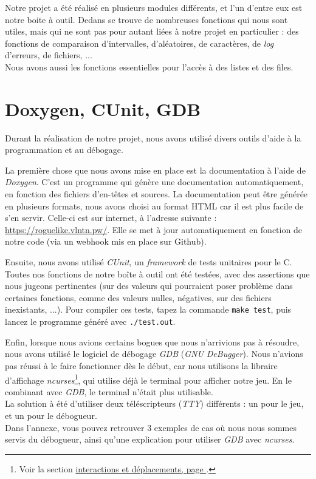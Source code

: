 \documentclass[11pt]{report}
\begin{document}
		Notre projet a été réalisé en plusieurs modules différents, et l'un d'entre eux est notre boite à outil. Dedans se trouve de nombreuses fonctions qui nous sont utiles, mais qui ne sont pas pour autant liées à notre projet en particulier : des fonctions de comparaison d'intervalles, d'aléatoires, de caractères, de \emph{log} d'erreurs, de fichiers, ...\\
		Nous avons aussi les fonctions essentielles pour l'accès à des listes et des files.

	\section{Doxygen, CUnit, GDB}\label{gdb}
	
		Durant la réalisation de notre projet, nous avons utilisé divers outils d'aide à la programmation et au débogage. 
		
		\vspace{12pt}		
		
		La première chose que nous avons mise en place est la documentation à l'aide de \emph{Doxygen}. C'est un programme qui génère une documentation automatiquement, en fonction des fichiers d'en-têtes et sources. La documentation peut être générée en  plusieurs formats, nous avons choisi au format HTML car il est plus facile de s'en servir. Celle-ci est sur internet, à l'adresse suivante : \url{https://roguelike.vlntn.pw/}. Elle se met à jour automatiquement en fonction de notre code (via un webhook mis en place sur Github).
		
		\vspace{12pt}
		
		Ensuite, nous avons utilisé \emph{CUnit}, un \emph{framework} de tests unitaires pour le C. Toutes nos fonctions de notre boîte à outil ont été testées, avec des assertions que nous jugeons pertinentes (sur des valeurs qui pourraient poser problème dans certaines fonctions, comme des valeurs nulles, négatives, sur des fichiers inexistants, ...). Pour compiler ces tests, tapez la commande \texttt{make test}, puis lancez le programme généré avec \texttt{./test.out}.
		
		\vspace{12pt}
		
		Enfin, lorsque nous avions certains bogues que nous n'arrivions pas à résoudre, nous avons utilisé le logiciel de débogage \emph{GDB} (\emph{GNU DeBugger}). Nous n'avions pas réussi à le faire fonctionner dès le début, car nous utilisons la libraire d'affichage \emph{ncurses}\footnote{Voir la section \hyperref[ncurses]{interactions et déplacements, page }.}, qui utilise déjà le terminal pour afficher notre jeu. En le combinant avec \emph{GDB}, le terminal n'était plus utilisable.\\
		La solution à été d'utiliser deux téléscripteurs (\emph{TTY}) différents : un pour le jeu, et un pour le débogueur.\\
		Dans l'annexe, vous pouvez retrouver 3 exemples de cas où nous nous sommes servis du débogueur, ainsi qu'une explication pour utiliser \emph{GDB} avec \emph{ncurses}.
\end{document}
